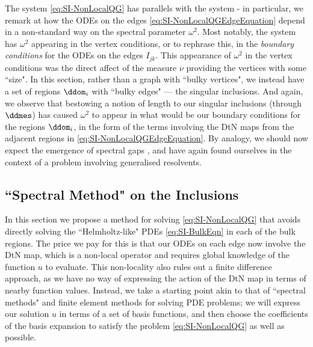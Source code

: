 The system \eqref{eq:SI-NonLocalQG} has parallels with the system  - in particular, we remark at how the ODEs on the edges \eqref{eq:SI-NonLocalQGEdgeEquation} depend in a non-standard way on the spectral parameter $\omega^2$.
Most notably, the system  has $\omega^2$ appearing in the vertex conditions, or to rephrase this, in the \emph{boundary conditions} for the ODEs on the edges $I_{jk}$.
This appearance of $\omega^2$ in the vertex conditions was the direct affect of the measure $\nu$ providing the vertices with some ``size".
In this section, rather than a graph with ``bulky vertices", we instead have a set of regions $\ddom_i$ with ``bulky edges" --- the singular inclusions.
And again, we observe that bestowing a notion of length to our singular inclusions (through $\ddmes$) has caused $\omega^2$ to appear in what would be our boundary conditions for the regions $\ddom_i$, in the form of the terms involving the DtN maps from the adjacent regions in \eqref{eq:SI-NonLocalQGEdgeEquation}.
By analogy, we should now expect the emergence of spectral gaps , and have again found ourselves in the context of a problem involving generalised resolvents.

\subsection{``Spectral Method" on the Inclusions} \label{ssec:SI-GraphMethod}

In this section we propose a method for solving \eqref{eq:SI-NonLocalQG} that avoids directly solving the ``Helmholtz-like" PDEs \eqref{eq:SI-BulkEqn} in each of the bulk regions.
The price we pay for this is that our ODEs on each edge now involve the DtN map, which is a non-local operator and requires global knowledge of the function $u$ to evaluate.
This non-locality also rules out a finite difference approach, as we have no way of expressing the action of the DtN map in terms of nearby function values.
Instead, we take a starting point akin to that of ``spectral methods" and finite element methods for solving PDE problems; we will express our solution $u$ in terms of a set of basis functions, and then choose the coefficients of the basis expansion to satisfy the problem \eqref{eq:SI-NonLocalQG} as well as possible.

